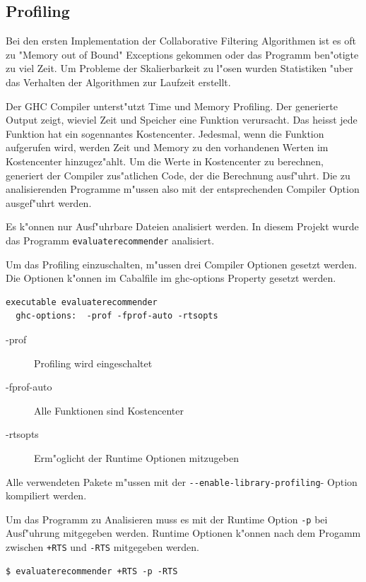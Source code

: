 \documentclass[a4paper, 12pt]{article}
\begin{document}
\subsection{Profiling}
\label{sec:profiling}

Bei den ersten Implementation der Collaborative Filtering Algorithmen ist es oft zu "Memory out of Bound" Exceptions gekommen oder das Programm ben"otigte zu viel Zeit. Um Probleme der Skalierbarkeit zu l"osen wurden Statistiken "uber das Verhalten der Algorithmen zur Laufzeit erstellt.

Der GHC Compiler unterst"utzt Time und Memory Profiling. Der generierte Output zeigt, wieviel Zeit und Speicher eine Funktion verursacht. Das heisst jede Funktion hat ein sogennantes Kostencenter. Jedesmal, wenn die Funktion aufgerufen wird, werden Zeit und Memory zu den vorhandenen Werten im Kostencenter hinzugez"ahlt. Um die Werte in Kostencenter zu berechnen, generiert der Compiler zus"atlichen Code, der die Berechnung ausf"uhrt. Die zu analisierenden Programme m"ussen also mit der entsprechenden Compiler Option ausgef"uhrt werden.

Es k"onnen nur Ausf"uhrbare Dateien analisiert werden. In diesem Projekt wurde das Programm \verb|evaluaterecommender| analisiert.

Um das Profiling einzuschalten, m"ussen drei Compiler Optionen gesetzt werden. Die Optionen k"onnen im Cabalfile im ghc-options Property gesetzt werden.
\begin{verbatim}
executable evaluaterecommender
  ghc-options:	-prof -fprof-auto -rtsopts
\end{verbatim}
\begin{description}
\item[-prof] Profiling wird eingeschaltet
\item[-fprof-auto] Alle Funktionen sind Kostencenter
\item[-rtsopts] Erm"oglicht der Runtime Optionen mitzugeben
\end{description}

Alle verwendeten Pakete m"ussen mit der \verb|--enable-library-profiling|- Option kompiliert werden.

Um das Programm zu Analisieren muss es mit der Runtime Option \verb|-p| bei Ausf"uhrung mitgegeben werden. Runtime Optionen k"onnen nach dem Progamm zwischen \verb|+RTS| und \verb|-RTS| mitgegeben werden.  

\begin{verbatim}
$ evaluaterecommender +RTS -p -RTS
\end{verbatim}
\end{document}
